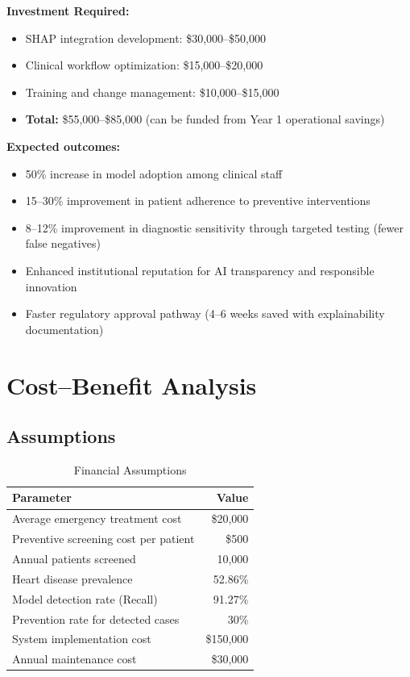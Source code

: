 \documentclass[12pt,a4paper]{article}
\begin{document}
\textbf{Investment Required:}
\begin{itemize}
    \item SHAP integration development: \$30,000--\$50,000
    \item Clinical workflow optimization: \$15,000--\$20,000
    \item Training and change management: \$10,000--\$15,000
    \item \textbf{Total:} \$55,000--\$85,000 (can be funded from Year 1 operational savings)
\end{itemize}

\textbf{Expected outcomes:}
\begin{itemize}
    \item 50\% increase in model adoption among clinical staff
    \item 15--30\% improvement in patient adherence to preventive interventions
    \item 8--12\% improvement in diagnostic sensitivity through targeted testing (fewer false negatives)
    \item Enhanced institutional reputation for AI transparency and responsible innovation
    \item Faster regulatory approval pathway (4--6 weeks saved with explainability documentation)
\end{itemize}

\section{Cost--Benefit Analysis}

\subsection{Assumptions}

\begin{table}[H]
\centering
\caption{Financial Assumptions}
\begin{tabular}{|l|r|}
\hline
\textbf{Parameter} & \textbf{Value} \\
\hline
Average emergency treatment cost & \$20,000 \\
Preventive screening cost per patient & \$500 \\
Annual patients screened & 10,000 \\
Heart disease prevalence & 52.86\% \\
Model detection rate (Recall) & 91.27\% \\
Prevention rate for detected cases & 30\% \\
System implementation cost & \$150,000 \\
Annual maintenance cost & \$30,000 \\
\hline
\end{tabular}
\end{table}
\end{document}
